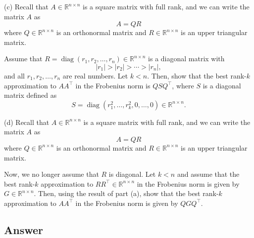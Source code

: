\documentclass[
  12pt,
]{fphw}
\begin{document}
(c) Recall that $A \in \mathbb{R}^{n\times n}$ is a square matrix with full rank, and we can write the matrix $A$ as
\[
A = QR \tag{2}
\]
where $Q \in \mathbb{R}^{n\times n}$ is an orthonormal matrix and $R \in \mathbb{R}^{n\times n}$ is an upper triangular matrix.

Assume that $R = \operatorname{diag}(r_1, r_2, \dots, r_n) \in \mathbb{R}^{n\times n}$ is a diagonal matrix with
\[
|r_1| > |r_2| > \cdots > |r_n|,
\]
and all $r_1, r_2, \dots, r_n$ are real numbers. Let $k < n$. Then, show that the best rank-$k$ approximation to $AA^\top$
in the Frobenius norm is $Q S Q^\top$, where $S$ is a diagonal matrix defined as
\[
S = \operatorname{diag}(r_1^2, \dots, r_k^2, 0, \dots, 0) \in \mathbb{R}^{n\times n}.
\]

(d) Recall that $A \in \mathbb{R}^{n\times n}$ is a square matrix with full rank, and we can write the matrix $A$ as
\[
A = QR \tag{3}
\]
where $Q \in \mathbb{R}^{n\times n}$ is an orthonormal matrix and $R \in \mathbb{R}^{n\times n}$ is an upper triangular matrix.

Now, we no longer assume that $R$ is diagonal. Let $k < n$ and assume that the best rank-$k$ approximation to
$RR^\top \in \mathbb{R}^{n\times n}$ in the Frobenius norm is given by $G \in \mathbb{R}^{n\times n}$. Then, using the result of part (a), show that
the best rank-$k$ approximation to $AA^\top$ in the Frobenius norm is given by $Q G Q^\top$.


\subsection*{Answer}
\end{document}

